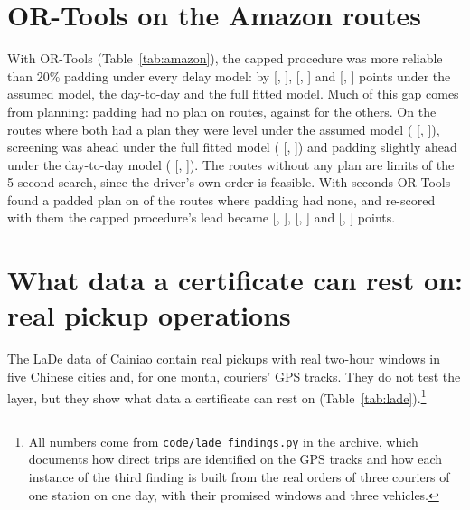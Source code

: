 \documentclass[11pt,a4paper]{article}
\theoremstyle{remark}
\begin{document}
\section{OR-Tools on the Amazon routes}\label{app:amazon-ortools}
\setcounter{table}{0}

With OR-Tools (Table~\ref{tab:amazon}), the capped procedure was more reliable than
20\% padding under every delay model: by \AmzCapDiff{} [\AmzCapDiffLo, \AmzCapDiffHi],
\AmzDCapDiff{} [\AmzDCapDiffLo, \AmzDCapDiffHi] and \AmzTCapDiff{} [\AmzTCapDiffLo,
\AmzTCapDiffHi] points under the assumed model, the day-to-day and the full fitted
model. Much of this gap comes from planning: padding had no plan on \AmzConsNoPlan{}
routes, against \AmzNoPlan{} for the others. On the \AmzBoth{} routes where both had a
plan they were level under the assumed model (\AmzBothDiff{} [\AmzBothDiffLo,
\AmzBothDiffHi]), screening was ahead under the full fitted model (\AmzTBothDiff{}
[\AmzTBothDiffLo, \AmzTBothDiffHi]) and padding slightly ahead under the day-to-day
model (\AmzDBothDiff{} [\AmzDBothDiffLo, \AmzDBothDiffHi]). The \AmzNoPlan{} routes
without any plan are limits of the 5-second search, since the driver's own order is
feasible. With \SrchSeconds{} seconds OR-Tools found a padded plan on \SrchConsFound{} of
the \SrchConsMissing{} routes where padding had none, and re-scored with them the
capped procedure's lead became \SrchDiff{} [\SrchDiffLo, \SrchDiffHi], \SrchDDiff{}
[\SrchDDiffLo, \SrchDDiffHi] and \SrchTDiff{} [\SrchTDiffLo, \SrchTDiffHi] points.



\section{What data a certificate can rest on: real pickup operations}\label{sec:real-ops}
\setcounter{table}{0}

The LaDe data of Cainiao \citep{wu2023lade} contain real pickups with real two-hour
windows in five Chinese cities and, for one month, couriers' GPS tracks. They do not test
the layer, but they show what data a certificate can rest on
(Table~\ref{tab:lade}).\footnote{All numbers come from \texttt{code/lade\_findings.py} in the
archive, which documents how direct trips are identified on the GPS tracks and how each
instance of the third finding is built from the real orders of three couriers of one
station on one day, with their promised windows and three vehicles.}
\end{document}
